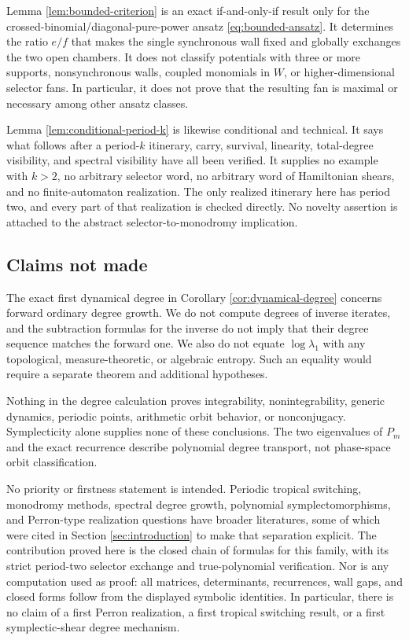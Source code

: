 \documentclass[11pt]{article}
\theoremstyle{definition}
\theoremstyle{remark}
\begin{document}
Lemma \ref{lem:bounded-criterion} is an exact if-and-only-if result only for
the crossed-binomial/diagonal-pure-power ansatz
\eqref{eq:bounded-ansatz}.  It determines the ratio \(e/f\) that makes the
single synchronous wall fixed and globally exchanges the two open chambers.
It does not classify potentials with three or more supports, nonsynchronous
walls, coupled monomials in \(W\), or higher-dimensional selector fans.  In
particular, it does not prove that the resulting fan is maximal or necessary
among other ansatz classes.

Lemma \ref{lem:conditional-period-k} is likewise conditional and technical.
It says what follows after a period-\(k\) itinerary, carry, survival,
linearity, total-degree visibility, and spectral visibility have all been
verified.  It supplies no example with \(k>2\), no arbitrary selector word,
no arbitrary word of Hamiltonian shears, and no finite-automaton realization.
The only realized itinerary here has
period two, and every part of that realization is checked directly.  No
novelty assertion is attached to the abstract selector-to-monodromy
implication.

\subsection{Claims not made}

The exact first dynamical degree in Corollary
\ref{cor:dynamical-degree} concerns forward ordinary degree growth.  We do
not compute degrees of inverse iterates, and the subtraction formulas for the
inverse do not imply that their degree sequence matches the forward one.  We
also do not equate \(\log\lambda_1\) with any topological, measure-theoretic,
or algebraic entropy.  Such an equality would require a separate theorem and
additional hypotheses.

Nothing in the degree calculation proves integrability, nonintegrability,
generic dynamics, periodic points, arithmetic orbit behavior, or
nonconjugacy.  Symplecticity alone supplies none of these conclusions.  The
two eigenvalues of \(P_m\) and the exact recurrence describe polynomial
degree transport, not phase-space orbit classification.

No priority or firstness statement is intended.  Periodic tropical
switching, monodromy methods, spectral degree growth, polynomial
symplectomorphisms, and Perron-type realization questions have broader
literatures, some of which were cited in Section \ref{sec:introduction} to
make that separation explicit.  The contribution proved here is the closed
chain of formulas for this family, with its strict period-two selector
exchange and true-polynomial verification.  Nor is any computation used as
proof: all matrices, determinants, recurrences, wall gaps, and closed forms
follow from the displayed symbolic identities.
In particular, there is no claim of a first Perron realization, a first
tropical switching result, or a first symplectic-shear degree mechanism.
\end{document}
